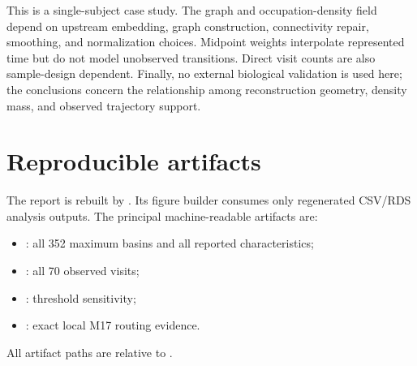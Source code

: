 \documentclass[11pt]{article}
\begin{document}
This is a single-subject case study.  The graph and occupation-density field
depend on upstream embedding, graph construction, connectivity repair,
smoothing, and normalization choices.  Midpoint weights interpolate
represented time but do not model unobserved transitions.  Direct visit counts
are also sample-design dependent.  Finally, no external biological validation
is used here; the conclusions concern the relationship among reconstruction
geometry, density mass, and observed trajectory support.

\section{Reproducible artifacts}

The report is rebuilt by
.
Its figure builder consumes only regenerated CSV/RDS analysis outputs.  The
principal machine-readable artifacts are:
\begin{itemize}
  \item {}: all 352 maximum
        basins and all reported characteristics;
  \item {}: all 70 observed visits;
  \item {}: threshold
        sensitivity;
  \item {}: exact local M17 routing evidence.
\end{itemize}
All artifact paths are relative to
.
\end{document}
